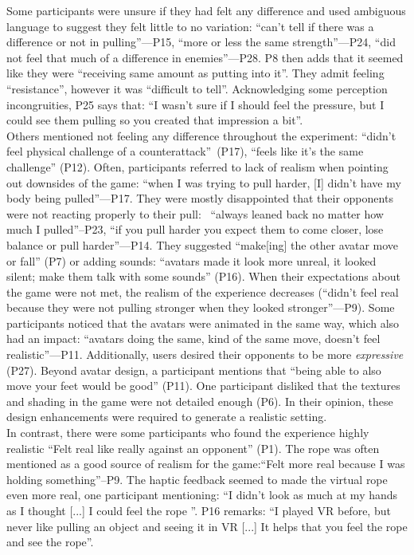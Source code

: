 Some participants were unsure if they had felt any difference and used ambiguous language to suggest they felt little to no variation: ``can't tell if there was a difference or not in pulling''---P15, ``more or less the same strength''---P24, ``did not feel that much of a difference in enemies''---P28. P8 then adds that it seemed like they were ``receiving same amount as putting into it''. They admit feeling ``resistance'', however it was ``difficult to tell''. Acknowledging some perception incongruities, P25 says that: ``I wasn't sure if I should feel the pressure, but I could see them pulling so you created that impression a bit''.\\
Others mentioned not feeling any difference throughout the experiment: ``didn't feel physical challenge of a counterattack''~(P17), ``feels like it's the same challenge'' (P12). Often, participants referred to lack of realism when pointing out downsides of the game: ``when I was trying to pull harder, [I] didn't have my body being pulled''---P17. They were mostly disappointed that their opponents were not reacting properly to their pull: ~``always leaned back no matter how much I pulled''--P23, ``if you pull harder you expect them to come closer, lose balance or pull harder''---P14.  They suggested ``make[ing] the other avatar move or fall'' (P7) or adding sounds: ``avatars made it look more unreal, it looked silent; make them talk with some sounds'' (P16). When their expectations about the game were not met, the realism of the experience decreases (``didn't feel real because they were not pulling stronger when they looked stronger''---P9). Some participants noticed that the avatars were animated in the same way, which also had an impact: ``avatars doing the same, kind of the same move, doesn't feel realistic''---P11. Additionally, users desired their opponents to be more \textit{expressive} (P27). Beyond avatar design, a participant mentions that ``being able to also move your feet would be good'' (P11). One participant disliked that the textures and shading in the game were not detailed enough (P6). In their opinion, these design enhancements were required to generate a realistic setting. \\
In contrast, there were some participants who found the experience highly realistic ``Felt real like really against an opponent'' (P1). The rope was often mentioned as a good source of realism for the game:``Felt more real because I was holding something''--P9. The haptic feedback seemed to made the virtual rope even more real, one participant mentioning: ``I didn't look as much at my hands as I thought [...] I could feel the rope ''. P16 remarks: ``I played VR before, but never like pulling an object and seeing it in VR [...] It helps that you feel the rope and see the rope''.
